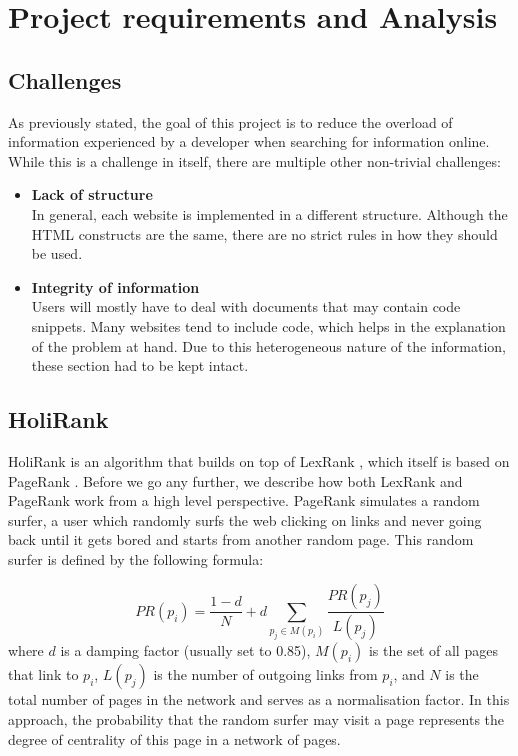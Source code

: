 \section{Project requirements and Analysis}\label{sec:requirementsAndAnalysis}


\subsection{Challenges}
As previously stated, the goal of this project is to reduce the overload of information experienced by a developer when searching for information online. While this is a challenge in itself, there are multiple other non-trivial challenges:

\begin{itemize}
\item {\bf Lack of structure}\label{sec:lackOfStructure}\\
In general, each website is implemented in a different structure. Although the HTML constructs are the same, there are no strict rules in how they should be used. %
\item {\bf Integrity of information}\\
Users will mostly have to deal with documents that may contain code snippets. Many websites tend to include code, which helps in the explanation of the problem at hand. Due to this heterogeneous nature of the information, these section had to be kept intact.

\end{itemize}

\subsection{HoliRank}

HoliRank \cite{Ponz2017a} is an algorithm that builds on top of LexRank \cite{Erkan:2004:LGL:1622487.1622501}, which itself is based on PageRank \cite{ilprints422}. 
Before we go any further, we describe how both LexRank and PageRank work from a high level perspective. PageRank simulates a random surfer, a user which randomly surfs the web clicking on links and never going back until it gets bored and starts from another random page. This random surfer is defined by the following formula:

\begin{equation}
PR(p_i) = \frac{1-d}{N}+ d\sum\limits_{p_j\in M(p_i)}\frac{PR(p_j)}{L(p_j)}
\end{equation}
where $d$ is a damping factor (usually set to 0.85), $M(p_i)$ is the set of all pages that link to $p_i$, $L(p_j)$ is the number of outgoing links from $p_i$, and $N$ is the total number of pages in the network and serves as a normalisation factor. In this approach, the probability that the random surfer may visit a page represents the degree of centrality of this page in a network of pages.

